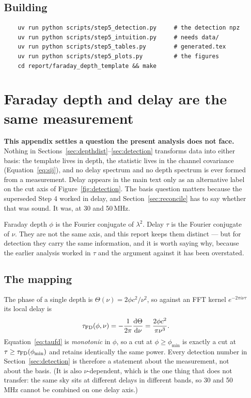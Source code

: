 \documentclass[11pt]{article}
\newcommand{\lamsq}{\ensuremath{\lambda^{2}}}
\begin{document}
\subsection{Building}

\begin{verbatim}
    uv run python scripts/step5_detection.py     # the detection npz
    uv run python scripts/step5_intuition.py     # needs data/
    uv run python scripts/step5_tables.py        # generated.tex
    uv run python scripts/step5_plots.py         # the figures
    cd report/faraday_depth_template && make
\end{verbatim}

\appendix

\section{Faraday depth and delay are the same measurement}
\label{sec:bases}

\textbf{This appendix settles a question the present analysis does not
face.} Nothing in Sections~\ref{sec:depthdist}--\ref{sec:detection}
transforms data into either basis: the template lives in depth, the
statistic lives in the channel covariance
(Equation~\eqref{eq:sij}), and no delay spectrum and no depth spectrum
is ever formed from a measurement. Delay appears in the main text only
as an alternative label on the cut axis of
Figure~\ref{fig:detection}. The basis question matters because the
superseded Step 4 worked in delay, and Section~\ref{sec:reconcile}
has to say whether that was sound. It was, at 30 and 50\,MHz.

Faraday depth $\phi$ is the Fourier conjugate of $\lamsq$. Delay $\tau$
is the Fourier conjugate of $\nu$. They are not the same axis, and this
report keeps them distinct --- but for detection they carry the same
information, and it is worth saying why, because the earlier analysis
worked in $\tau$ and the argument against it has been overstated.

\subsection{The mapping}

The phase of a single depth is $\Theta(\nu) = 2\phi c^2/\nu^2$, so
against an FFT kernel $e^{-2\pi i\nu\tau}$ its local delay is
\begin{equation}
  \tau_{\rm FD}(\phi,\nu)
  = -\frac{1}{2\pi}\frac{\mathrm d\Theta}{\mathrm d\nu}
  = \frac{2\phi c^2}{\pi\nu^3}.
  \label{eq:taufd}
\end{equation}
Equation~\eqref{eq:taufd} is \emph{monotonic} in $\phi$, so a cut at
$\phi \ge \phi_{\min}$ is exactly a cut at
$\tau \ge \tau_{\rm FD}(\phi_{\min})$ and retains identically the same
power. Every detection number in Section~\ref{sec:detection} is
therefore a statement about the measurement, not about the basis. (It
is also $\nu$-dependent, which is the one thing that does not transfer:
the same sky sits at different delays in different bands, so 30 and
50\,MHz cannot be combined on one delay axis.)
\end{document}
